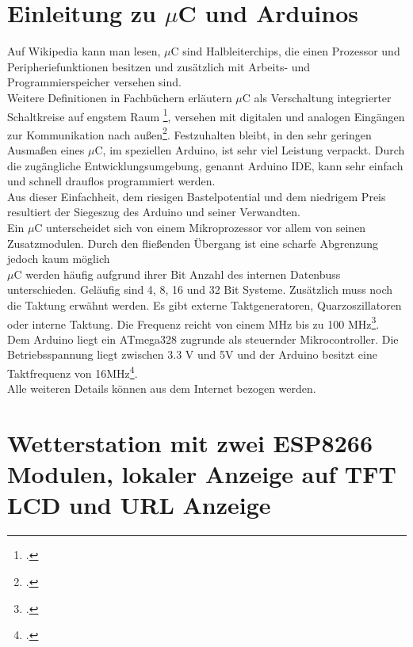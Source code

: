 \documentclass[12pt,a4paper]{scrartcl}	%
\begin{document}
\section{Einleitung zu $\mu$C und Arduinos}
Auf Wikipedia kann man lesen, $\mu$C sind Halbleiterchips, die einen Prozessor und Peripheriefunktionen besitzen und zusätzlich  mit Arbeits- und Programmierspeicher versehen sind.\\
Weitere Definitionen in Fachbüchern erläutern $\mu$C als Verschaltung integrierter Schaltkreise auf engstem Raum \footcite[vgl.][S.1 \psq]{Bart}, versehen mit digitalen und analogen Eingängen zur Kommunikation nach außen\footcite[vgl.][S. 23]{Bruhl}. 
Festzuhalten bleibt, in den sehr geringen Ausmaßen eines $\mu$C, im speziellen Arduino, ist sehr viel Leistung verpackt. Durch die zugängliche Entwicklungsumgebung, genannt Arduino IDE, kann sehr einfach und schnell drauflos programmiert werden.\\
 Aus dieser Einfachheit, dem riesigen Bastelpotential und dem niedrigem Preis resultiert der Siegeszug des Arduino und seiner \glqq Verwandten\grqq .\\
Ein $\mu$C unterscheidet sich von einem Mikroprozessor vor allem von seinen Zusatzmodulen. Durch den fließenden Übergang ist eine scharfe Abgrenzung jedoch kaum möglich\\
$\mu$C werden häufig aufgrund ihrer Bit Anzahl des internen Datenbuss unterschieden. Geläufig sind 4, 8, 16 und 32 Bit Systeme. Zusätzlich muss noch die Taktung erwähnt werden. Es gibt externe Taktgeneratoren, Quarzoszillatoren oder interne Taktung. Die Frequenz reicht von einem MHz bis zu 100 MHz\footcite[vgl.][Abruf am 04.07.2018]{Mikro}.\\
Dem Arduino liegt ein ATmega328 zugrunde als steuernder Mikrocontroller. Die Betriebsspannung liegt zwischen 3.3 V und 5V und der Arduino besitzt eine Taktfrequenz von 16MHz\footcite[vgl.][S. 28]{Bruhl}.\\
Alle weiteren Details können aus dem Internet bezogen werden.
\section{Wetterstation mit zwei ESP8266 Modulen, lokaler Anzeige auf TFT LCD und URL Anzeige}
\end{document}
